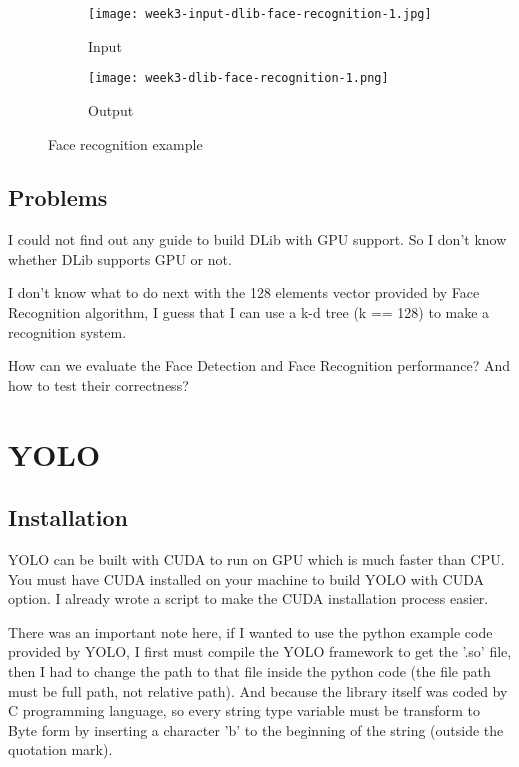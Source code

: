 \begin{figure}[!ht]
\centering
\begin{subfigure}{0.3\textwidth}
  \centering
  \texttt{[image: week3-input-dlib-face-recognition-1.jpg]}
  \caption{Input}
\end{subfigure}%
\begin{subfigure}{0.7\textwidth}
  \centering
  \texttt{[image: week3-dlib-face-recognition-1.png]}
  \caption{Output}
\end{subfigure}
\caption{Face recognition example}
\end{figure}

\subsection{Problems}
I could not find out any guide to build DLib with GPU support. So I don't know whether DLib supports GPU or not.

I don't know what to do next with the 128 elements vector provided by Face Recognition algorithm, I guess that I can use a k-d tree (k == 128) to make a recognition system.

How can we evaluate the Face Detection and Face Recognition performance? And how to test their correctness?


\section{YOLO}
\subsection{Installation}
YOLO can be built with CUDA to run on GPU which is much faster than CPU. You must have CUDA installed on your machine to build YOLO with CUDA option. I already wrote a script to make the CUDA installation process easier.

There was an important note here, if I wanted to use the python example code provided by YOLO, I first must compile the YOLO framework to get the '.so' file, then I had to change the path to that file inside the python code (the file path must be full path, not relative path). And because the library itself was coded by C programming language, so every string type variable must be transform to Byte form by inserting a character 'b' to the beginning of the string (outside the quotation mark).

